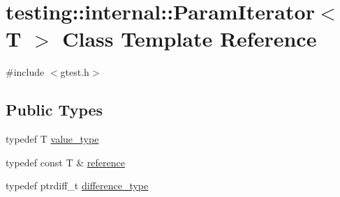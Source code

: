 \hypertarget{classtesting_1_1internal_1_1_param_iterator}{\section{testing\-:\-:internal\-:\-:Param\-Iterator$<$ T $>$ Class Template Reference}
\label{classtesting_1_1internal_1_1_param_iterator}
}


{\ttfamily \#include $<$gtest.\-h$>$}

\subsection*{Public Types}
\begin{DoxyCompactItemize}
\item 
typedef T \hyperlink{classtesting_1_1internal_1_1_param_iterator_a4afe3a68db0d0744753c8afe262e35df}{value\-\_\-type}
\item 
typedef const T \& \hyperlink{classtesting_1_1internal_1_1_param_iterator_ac96f133ffa06fc0f9faff5a1c7954382}{reference}
\item 
typedef ptrdiff\-\_\-t \hyperlink{classtesting_1_1internal_1_1_param_iterator_a6c37240a04ba3fc4c56f6c413cf4771d}{difference\-\_\-type}
\end{DoxyCompactItemize}
